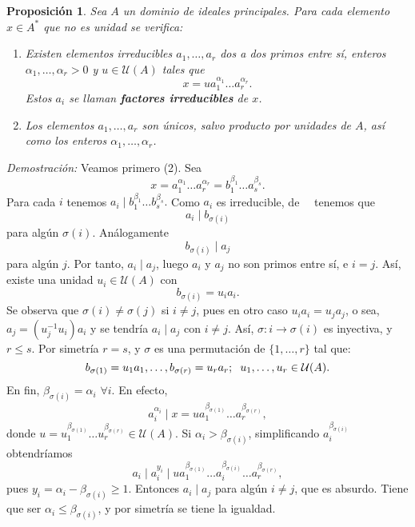 \documentclass[12pt]{article}
\newtheorem{proposition}[theorem]{Proposición}
\begin{document}
\begin{proposition} Sea $A$ un dominio de ideales principales. Para cada elemento $x \in A^{\ast}$ que no es unidad se verifica: \begin{enumerate}
\item Existen elementos irreducibles $a_{1}, \ldots, a_{r}$ dos a dos primos entre sí, enteros $\alpha_{1}, \ldots, \alpha_{r} > 0$ y $u \in \mathcal{U}(A)$ tales que $$x = ua_{1}^{\alpha_{1}}\ldots a_{r}^{\alpha_{r}}.$$ Estos $a_{i}$ se llaman \textbf{factores irreducibles} de $x$.
\item Los elementos $a_{1}, \ldots, a_{r}$ son únicos, salvo producto por unidades de $A$, así como los enteros $\alpha_{1}, \ldots,\alpha_{r}$. 
\end{enumerate}
\end{proposition}
\emph{Demostración: } Veamos primero (2). Sea $$x = a_{1}^{\alpha_{1}} \ldots  a_{r}^{\alpha_{r}} = b_{1}^{\beta_{1}} \ldots  a_{s}^{\beta_{s}}.$$ Para cada $i$ tenemos $a_{i} \mid b_{1}^{\beta_{1}} \ldots b_{s}^{\beta_{s}}.$ Como $a_{i}$ es irreducible, de~~ tenemos que $$a_{i} \mid b_{\sigma (i)}$$ para algún $\sigma (i)$. Análogamente $$b_{\sigma(i)}\mid a_{j}$$ para algún $j$. Por tanto, $a_{i} \mid a_{j}$, luego $a_{i}$ y $a_{j}$ no son primos entre sí, e $i = j$. Así, existe una unidad $u_{i} \in \mathcal{U}(A)$ con $$b_{\sigma(i)} = u_{i}a_{i}.$$ Se observa que $\sigma(i) \neq \sigma (j)$ si $i \neq j$, pues en otro caso $u_{i}a_{i} = u_{j}a_{j}$, o sea, $a_{j} = (u_{j}^{-1}u_{i})a_{i}$ y se tendría $a_{i} \mid a_{j}$ con $i \neq j$. Así, $\sigma \colon i \longrightarrow \sigma (i)$ es inyectiva, y $r \leq s$. Por simetría $r = s$, y $\sigma$ es una permutación de $\lbrace 1, \ldots, r \rbrace$ tal que: $$b_{\sigma(1)} = u_{1}a_{1}, \ldots, b_{\sigma(r)} = u_{r}a_{r}; \hspace{0.2cm} u_{1}, \ldots, u_{r} \in \mathcal{U}(A).$$
En fin, $\beta_{\sigma(i)} = \alpha_{i} $ \hspace{0.1cm} $\forall i$. En efecto, $$a_{i}^{\alpha_{i}} \mid x = u a_{1}^{\beta_{\sigma(1)}} \ldots a_{r}^{\beta_{\sigma(r)}},$$ donde $u = u_{1}^{\beta_{\sigma(1)}} \ldots u_{r}^{\beta_{\sigma(r)}} \in \mathcal{U}(A).$ Si $\alpha_{i} > \beta_{\sigma(i)}$, simplificando $a_{i}^{\beta_{\sigma(i)}}$ obtendríamos $$a_{i} \mid a_{i}^{y_{i}} \mid  u a_{1}^{\beta_{\sigma(1)}} \ldots a_{i}^{\beta_{\sigma(i)}} \ldots a_{r}^{\beta_{\sigma(r)}},$$ pues $y_{i} = \alpha_{i} - \beta_{\sigma(i)} \geq 1.$ Entonces $a_{i} \mid a_{j}$ para algún $i \neq j$, que es absurdo. Tiene que ser $\alpha_{i} \leq \beta_{\sigma(i)}$, y por simetría se tiene la igualdad. 
\end{document}
